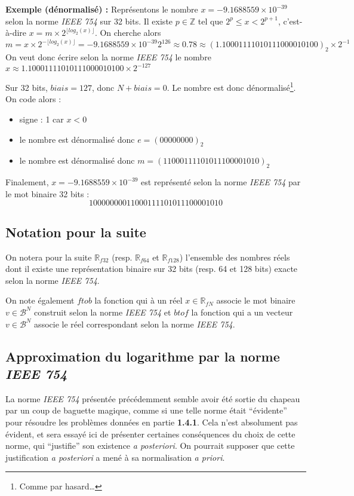 \documentclass[../../main.tex]{subfiles}
\begin{document}
\textbf{Exemple (dénormalisé) : } Représentons le nombre $x = -9.1688559\times{10^{-39}}$ selon la norme \textit{IEEE 754} sur 32 bits. \newline
Il existe $p\in{\mathbb{Z}}$ tel que $2^{p}\leq x < 2^{p+1}$, c'est-à-dire $x = m\times{2^{\lfloor log_{2}(x)\rfloor}}$.\newline
On cherche alors $m = x\times 2^{-\lfloor log_2(x)\rfloor} = -9.1688559\times10^{-39}2^{126} \approx 0.78 \approx (1.10001111010111000010100)_{2}\times{2^{-1}}$ \newline
On veut donc écrire selon la norme \textit{IEEE 754} le nombre $x \approx 1.10001111010111000010100\times{2^{-127}}$

Sur 32 bits, $biais = 127$, donc $N + biais = 0$. Le nombre est donc dénormalisé\footnote{Comme par hasard\dots}. On code alors :
\begin{itemize}
  \item signe : 1 car $x < 0$
  \item le nombre est dénormalisé donc $e = (00000000)_2$
  \item le nombre est dénormalisé donc $m = (11000111101011100001010)_2$
\end{itemize}
Finalement, $x = -9.1688559\times{10^{-39}}$ est représenté selon la norme \textit{IEEE 754} par le mot binaire 32 bits : $$10000000011000111101011100001010$$
\subsection{Notation pour la suite} \label{sub:notation_pour_la_suite_du_cours}
On notera pour la suite $\mathbb{R}_{f32}$ (resp. $\mathbb{R}_{f64}$ et $\mathbb{R}_{f128
}$) l'ensemble des nombres réels dont il existe une représentation binaire sur 32 bits (resp. 64 et 128 bits) exacte selon la norme \textit{IEEE 754}.

On note également $ftob$ la fonction qui à un réel $x\in\mathbb{R}_{fN}$ associe le mot binaire $v\in \mathcal{B}^N$ construit selon la norme \textit{IEEE 754} et $btof$ la fonction qui a un vecteur $v\in\mathcal{B}^{N}$ associe le réel correspondant selon la norme \textit{IEEE 754}.
\subsection{Approximation du logarithme par la norme \textit{IEEE 754}} \label{sub:approximation_du_logarithme_par_la_norme_ieee_754}
La norme \textit{IEEE 754} présentée précédemment semble avoir été sortie du chapeau par un coup de baguette magique, comme si une telle norme était ``évidente'' pour résoudre les problèmes données en partie \textbf{1.4.1}. Cela n'est absolument pas évident, et sera essayé ici de présenter certaines conséquences du choix de cette norme, qui ``justifie'' son existence \textit{a posteriori}. On pourrait supposer que cette justification \textit{a posteriori} a mené à sa normalisation \textit{a priori}.
\end{document}
